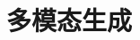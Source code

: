 \setcounter{chapter}{27}

\hypertarget{ux591aux6a21ux6001ux751fux6210}{%
\chapter{多模态生成}\label{ux591aux6a21ux6001ux751fux6210}}
